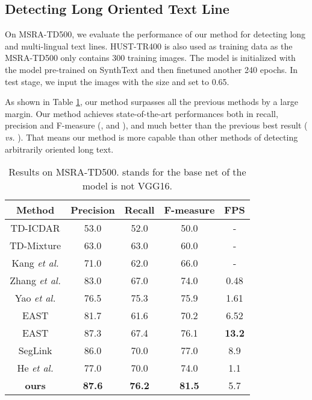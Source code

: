 \documentclass[10pt,twocolumn,letterpaper]{article}
\begin{document}
\subsection{Detecting Long Oriented Text Line}

On MSRA-TD500, we evaluate the performance of our method for detecting long and multi-lingual text lines. HUST-TR400 is also used as training data as the MSRA-TD500 only contains 300 training images. The model is initialized with the model pre-trained on SynthText and then finetuned another 240 epochs. In test stage, we input the images with the size  and set  to 0.65.

As shown in Table \ref{tab_msra}, our method surpasses all the previous methods by a large margin. Our method achieves state-of-the-art performances both in recall, precision and F-measure (,  and ), and much better than the previous best result ( \emph{vs.} ). That means our method is more capable than other methods of detecting arbitrarily oriented long text.

\begin{table}

\small

\begin{centering}
\begin{tabular}{|c|c|c|c|c|}
\hline 
\textbf{Method} & \textbf{Precision} & \textbf{Recall} & \textbf{F-measure} &\textbf{FPS} \tabularnewline
\hline 
\hline
TD-ICDAR \cite{yao2012detecting} & 53.0 & 52.0 & 50.0 & -\tabularnewline

\hline
TD-Mixture \cite{yao2012detecting} & 63.0 & 63.0 & 60.0 & -\tabularnewline


\hline
Kang \emph{et al.} \cite{kang2014orientation} & 71.0 &  62.0 & 66.0 & -\tabularnewline




\hline
Zhang \emph{et al.} \cite{zhang2016multi} & 83.0 & 67.0 & 74.0 & 0.48\tabularnewline

\hline 
Yao \emph{et al.} \cite{yao2016scene} & 76.5  & 75.3  & 75.9 &  1.61\tabularnewline





\hline 
EAST \cite{Zhou_2017_CVPR}  & 81.7  & 61.6 & 70.2 & 6.52 \tabularnewline
\hline 
EAST   \cite{Zhou_2017_CVPR} & 87.3  & 67.4 & 76.1 & \textbf{13.2} \tabularnewline
\hline 
SegLink \cite{Shi_2017_CVPR} & 86.0  & 70.0 & 77.0 & 8.9 \tabularnewline
\hline 
He \emph{et al.}  \cite{He_2017_ICCV} & 77.0  &  70.0 & 74.0 & 1.1 \tabularnewline
\hline
\textbf{ours} & \textbf{87.6} & \textbf{76.2} & \textbf{81.5} & 5.7 \tabularnewline
\hline
\end{tabular}
\par\end{centering}
\caption{Results on MSRA-TD500.  stands for the base net of the model is not VGG16.}
\label{tab_msra}
\end{table}
\end{document}
